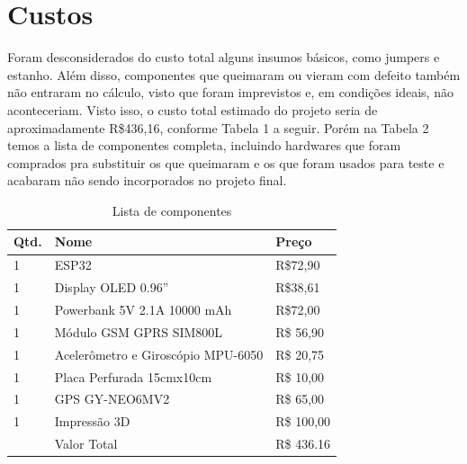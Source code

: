 \section{Custos}

Foram desconsiderados do custo total alguns insumos básicos, como jumpers e estanho. Além disso, componentes que queimaram ou vieram com defeito também não entraram no cálculo, visto que foram imprevistos e, em condições ideais, não aconteceriam. Visto isso, o custo total estimado do projeto seria de aproximadamente R\$436,16, conforme Tabela 1 a seguir. Porém na Tabela 2 temos a lista de componentes completa, incluindo hardwares que foram comprados pra substituir os que queimaram e os que foram usados para teste e acabaram não sendo incorporados no projeto final.

\newpage

\begin{table}[]
\centering
\label{tab:componentes} 
\begin{tabular}{|l|l|l|}
\hline
Qtd. & Nome                               & Preço     \\ \hline
1    & ESP32                              & R\$72,90  \\ \hline
1    & Display OLED 0.96”                 & R\$38,61  \\ \hline
1    & Powerbank 5V 2.1A 10000 mAh        & R\$72,00  \\ \hline
1    & Módulo GSM GPRS SIM800L            & R\$ 56,90 \\ \hline
1    & Acelerômetro e Giroscópio MPU-6050 & R\$ 20,75 \\ \hline
1    & Placa Perfurada 15cmx10cm          & R\$ 10,00 \\ \hline
1    & GPS GY-NEO6MV2                         & R\$ 65,00 \\ \hline
1    & Impressão 3D                       & R\$ 100,00 \\ \hline
     & Valor Total                        & R\$ 436.16 \\ \hline
\end{tabular}
\caption{Lista de componentes}
\end{table}


